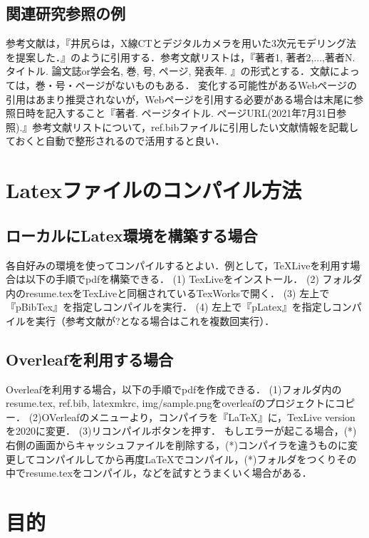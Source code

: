 \documentclass[12pt,a4j]{jreport}
\begin{document}
\subsection{関連研究参照の例}
参考文献は，『井尻らは，X線CTとデジタルカメラを用いた3次元モデリング法を提案した\cite{Ijiri18}．』のように引用する．参考文献リストは，『著者1, 著者2,...,著者N. タイトル. 論文誌or学会名, 巻, 号, ページ, 発表年. 』の形式とする．文献によっては，巻・号・ページがないものもある．
変化する可能性があるWebページの引用はあまり推奨されないが，Webページを引用する必要がある場合は末尾に参照日時を記入すること『著者. ページタイトル. ページURL(2021年7月31日参照).』参考文献リストについて，ref.bibファイルに引用したい文献情報を記載しておくと自動で整形されるので活用すると良い．


\section{Latexファイルのコンパイル方法}

\subsection{ローカルにLatex環境を構築する場合}
各自好みの環境を使ってコンパイルするとよい．例として，TeXLiveを利用す場合は以下の手順でpdfを構築できる．
(1) TexLive\cite{TexLive}をインストール．
(2) フォルダ内のresume.texをTexLiveと同梱されているTexWorksで開く．
(3) 左上で『pBibTex』を指定しコンパイルを実行．
(4) 左上で『pLatex』を指定しコンパイルを実行（参考文献が?となる場合はこれを複数回実行）．


\subsection{Overleafを利用する場合}
Overleafを利用する場合，以下の手順でpdfを作成できる．
(1)フォルダ内のresume.tex, ref.bib, latexmkrc, img/sample.pngをoverleafのプロジェクトにコピー．
(2)OVerleafのメニューより，コンパイラを『LaTeX』に，TexLive versionを2020に変更．
(3)リコンパイルボタンを押す．
もしエラーが起こる場合，(*)右側の画面からキャッシュファイルを削除する，(*)コンパイラを違うものに変更してコンパイルしてから再度LaTeXでコンパイル，(*)フォルダをつくりその中でresume.texをコンパイル，などを試すとうまくいく場合がある．



\section{目的}
\end{document}
